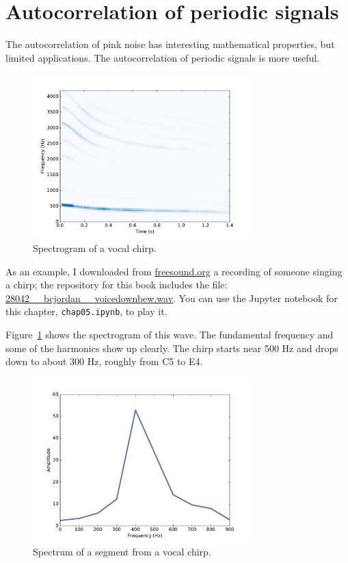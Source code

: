 \documentclass[12pt]{book}
\begin{document}
\section{Autocorrelation of periodic signals}

The autocorrelation of pink noise has interesting mathematical
properties, but limited applications.  The autocorrelation of
periodic signals is more useful.

\begin{figure}
\centerline{\includegraphics[height=2.5in]{figs/autocorr5.pdf}}
\caption{Spectrogram of a vocal chirp.}
\label{fig.autocorr5}
\end{figure}

As an example, I downloaded from \url{freesound.org} a recording of
someone singing a chirp; the repository for this book includes the
file: \url{28042__bcjordan__voicedownbew.wav}.  You can use the
Jupyter notebook for this chapter, {\tt chap05.ipynb}, to play it.

Figure~\ref{fig.autocorr5} shows the spectrogram of this wave.
The fundamental frequency and some of the harmonics show up clearly.
The chirp starts near 500 Hz and drops down to about 300 Hz, roughly
from C5 to E4.

\begin{figure}
\centerline{\includegraphics[height=2.5in]{figs/autocorr6.pdf}}
\caption{Spectrum of a segment from a vocal chirp.}
\label{fig.autocorr6}
\end{figure}
\end{document}
